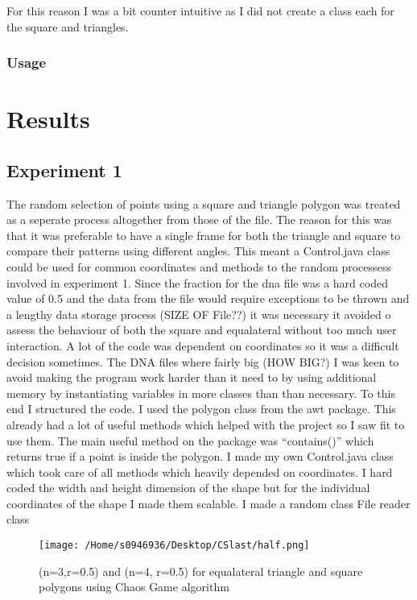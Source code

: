 \documentclass[]{report}   %
\begin{document}
	For this reason I was a bit counter intuitive as I did not create a class each for the square and triangles. 
	
\subsection{Usage}         %
\chapter*{Results} 
\section{Experiment 1}     %

	The random selection of points using a square and triangle polygon was treated as a seperate process altogether from those of the file. 
The reason for this was that it was preferable to have a single frame for both the triangle and square to compare their patterns using different angles.
This meant a Control.java class could be used for common coordinates and methods to the random processess involved in experiment 1.
Since the fraction for the dna file was a hard coded value of 0.5 and the data from the file would require exceptions to be thrown and a lengthy data storage process (SIZE OF File??) 
it was necessary it avoided 
o assess the behaviour of both the square and equalateral without too much user interaction. 
 A lot of the code was dependent on coordinates so it was a difficult decision sometimes. 
	The DNA  files where fairly big (HOW BIG?) I was keen to avoid making the 	program work harder than it need to by using additional memory by instantiating variables in more classes than than necessary.
	To this end I structured the code.
	I used the polygon class from the awt package. This already had a lot of useful methods which helped with the project so I saw fit to use them. The main useful method on the package was “contains()” which returns true if a point is inside the polygon.
	I made my own Control.java class which took care of all methods which heavily depended on coordinates. I hard coded the width and height dimension of the shape but for the individual coordinates of the shape I made them scalable.  
	I made a random class 
	File reader class

\begin{figure}[htb]
\texttt{[image: /Home/s0946936/Desktop/CSlast/half.png]}
\caption{(n=3,r=0.5) and (n=4, r=0.5) for equalateral triangle and square polygons using Chaos Game algorithm}
\label{fig:Key result of Experiment 1 (r=0.5)}
\end{figure}
\end{document}
